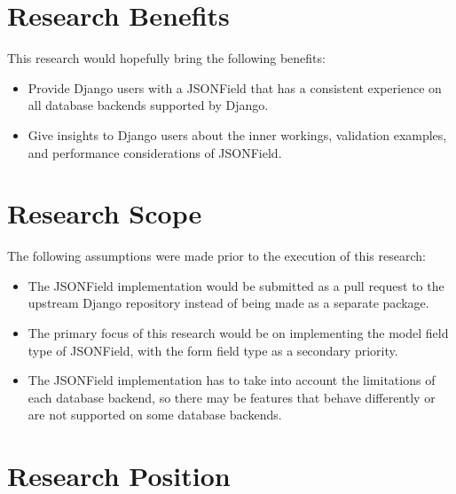 \section{Research Benefits}

This research would hopefully bring the following benefits:

\begin{itemize}
    \item Provide Django users with a JSONField that has a consistent
          experience on all database backends supported by Django.
    \item Give insights to Django users about the inner workings, validation
          examples, and performance considerations of JSONField.
\end{itemize}

\section{Research Scope}

The following assumptions were made prior to the execution of this research:

\begin{itemize}
    \item The JSONField implementation would be submitted as a pull request to
          the upstream Django repository instead of being made as a separate
          package.
    \item The primary focus of this research would be on implementing the model
          field type of JSONField, with the form field type as a secondary
          priority.
    \item The JSONField implementation has to take into account the limitations
          of each database backend, so there may be features that behave
          differently or are not supported on some database backends.
\end{itemize}

\section{Research Position}

